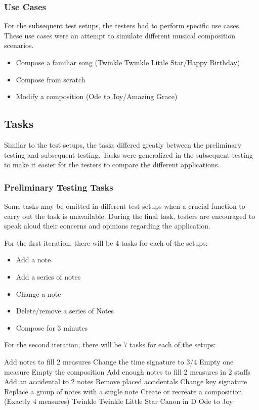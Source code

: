 			\subsubsection{Use Cases}
			\label{sec:use-cases}

				For the subsequent test setups, the testers had to perform specific use cases. These use cases were an attempt to simulate different musical composition scenarios. 

				\begin{itemize}
				    \item Compose a familiar song (Twinkle Twinkle Little Star/Happy Birthday)
				    \item Compose from scratch
				    \item Modify a composition (Ode to Joy/Amazing Grace)
				\end{itemize}

		\subsection{Tasks}
		\label{sec:tasks}

			Similar to the test setups, the tasks differed greatly between the preliminary testing and subsequent testing. Tasks were generalized in the subsequent testing to make it easier for the testers to compare the different applications.

			\subsubsection{Preliminary Testing Tasks}
			\label{sec:preliminary-tasks}

				Some tasks may be omitted in different test setups when a crucial function to carry out the task is unavailable. During the final task, testers are encouraged to speak aloud their concerns and opinions regarding the application.

				For the first iteration, there will be 4 tasks for each of the setups:
				\begin{itemize}
					\item Add a note
					\item Add a series of notes
					\item Change a note
					\item Delete/remove a series of Notes
					\item Compose for 3 minutes
				\end{itemize}

				For the second iteration, there will be 7 tasks for each of the setups:
				\begin{outline}
					\1 Add notes to fill 2 measures
					\1 Change the time signature to 3/4
					\1 Empty one measure
					\1 Empty the composition
					\1 Add enough notes to fill 2 measures in 2 staffs
					\1 Add an accidental to 2 notes
					\1 Remove placed accidentals 
					\1 Change key signature
					\1 Replace a group of notes with a single note
					\1 Create or recreate a composition (Exactly 4 measures)
						\2 Twinkle Twinkle Little Star
						\2 Canon in D
						\2 Ode to Joy
				\end{outline}

